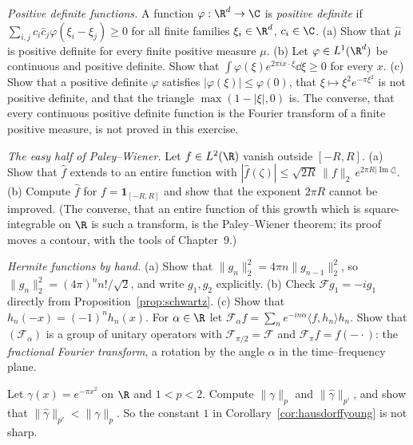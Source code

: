\begin{exercise}[$\star\star$]\label{ex:bochner}
\emph{Positive definite functions.} A function $\varphi:\R^d\to\C$ is \emph{positive definite} if $\sum_{i,j}c_i\bar c_j\varphi(\xi_i-\xi_j)\ge0$ for all finite families $\xi_i\in\R^d$, $c_i\in\C$. (a) Show that $\hat\mu$ is positive
definite for every finite positive measure $\mu$. (b) Let $\varphi\in L^1(\R^d)$ be continuous and positive definite. Show that $\int\varphi(\xi)e^{2\pi ix\cdot\xi}\dd\xi\ge0$ for every $x$. (c) Show that a positive definite $\varphi$
satisfies $|\varphi(\xi)|\le\varphi(0)$, that $\xi\mapsto\xi^2e^{-\pi\xi^2}$ is not positive definite, and that the triangle $\max(1-|\xi|,0)$ is. The converse, that every continuous positive definite function is the Fourier transform of a finite positive measure, is not proved in this exercise.
\end{exercise}

\begin{exercise}[$\star\star$]\label{ex:paleywiener}
\emph{The easy half of Paley--Wiener.} Let $f\in L^2(\R)$ vanish outside $[-R,R]$. (a) Show that $\hat f$ extends to an entire function with $|\hat f(\zeta)|\le\sqrt{2R}\,\|f\|_2\,e^{2\pi R|\operatorname{Im}\zeta|}$. (b) Compute
$\hat f$ for $f=\mathbf 1_{[-R,R]}$ and show that the exponent $2\pi R$ cannot be improved. (The converse, that an entire function of this growth which is square-integrable on $\R$ is such a transform, is the
Paley--Wiener theorem; its proof moves a contour, with the tools of Chapter~9.)
\end{exercise}

\begin{exercise}[$\star$]\label{ex:hermitecalc}
\emph{Hermite functions by hand.} (a) Show that $\|g_n\|_2^2=4\pi n\|g_{n-1}\|_2^2$, so $\|g_n\|_2^2=(4\pi)^nn!/\sqrt2$, and write $g_1,g_2$ explicitly. (b) Check $\mathcal Fg_1=-ig_1$ directly from Proposition~\ref{prop:schwartz}.
(c) Show that $h_n(-x)=(-1)^nh_n(x)$. For $\alpha\in\R$ let $\mathcal F_\alpha f=\sum_ne^{-in\alpha}\langle f,h_n\rangle h_n$. Show that $(\mathcal F_\alpha)$ is a group of unitary operators with $\mathcal F_{\pi/2}=\mathcal F$ and
$\mathcal F_\pi f=f(-\cdot)$: the \emph{fractional Fourier transform}, a rotation by the angle $\alpha$ in the time--frequency plane.
\end{exercise}

\begin{exercise}[$\star$]\label{ex:hysharp}
Let $\gamma(x)=e^{-\pi x^2}$ on $\R$ and $1<p<2$. Compute $\|\gamma\|_p$ and $\|\hat\gamma\|_{p'}$, and show that $\|\hat\gamma\|_{p'}<\|\gamma\|_p$. So the constant $1$ in Corollary~\ref{cor:hausdorffyoung} is not sharp.
\end{exercise}

